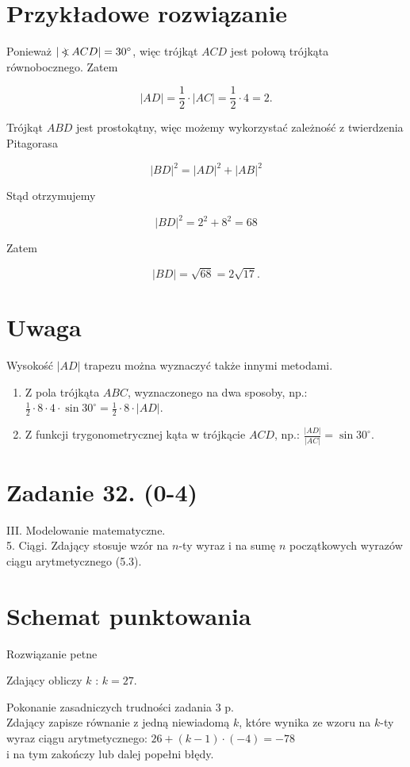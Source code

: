 \documentclass[10pt]{article}
\newcommand\Varangle{\mathop{{<\!\!\!\!\!\text{\small)}}\:}\nolimits}
\begin{document}
\section*{Przykładowe rozwiązanie}
Ponieważ $|\Varangle A C D|=30^{\circ}$, więc trójkąt $A C D$ jest połową trójkąta równobocznego. Zatem

$$
|A D|=\frac{1}{2} \cdot|A C|=\frac{1}{2} \cdot 4=2 .
$$

Trójkąt $A B D$ jest prostokątny, więc możemy wykorzystać zależność z twierdzenia Pitagorasa

$$
|B D|^{2}=|A D|^{2}+|A B|^{2}
$$

Stąd otrzymujemy

$$
|B D|^{2}=2^{2}+8^{2}=68
$$

Zatem

$$
|B D|=\sqrt{68}=2 \sqrt{17} .
$$

\section*{Uwaga}
Wysokość $|A D|$ trapezu można wyznaczyć także innymi metodami.

\begin{enumerate}
  \item Z pola trójkąta $A B C$, wyznaczonego na dwa sposoby, np.: $\frac{1}{2} \cdot 8 \cdot 4 \cdot \sin 30^{\circ}=\frac{1}{2} \cdot 8 \cdot|A D|$.
  \item Z funkcji trygonometrycznej kąta w trójkącie $A C D$, np.: $\frac{|A D|}{|A C|}=\sin 30^{\circ}$.
\end{enumerate}

\section*{Zadanie 32. (0-4)}
III. Modelowanie matematyczne.\\
5. Ciągi. Zdający stosuje wzór na $n$-ty wyraz i na sumę $n$ początkowych wyrazów ciągu arytmetycznego (5.3).

\section*{Schemat punktowania}
Rozwiązanie petne

Zdający obliczy $k$ : $k=27$.

Pokonanie zasadniczych trudności zadania 3 p.\\
Zdający zapisze równanie z jedną niewiadomą $k$, które wynika ze wzoru na $k$-ty wyraz ciągu arytmetycznego: $26+(k-1) \cdot(-4)=-78$\\
i na tym zakończy lub dalej popełni błędy.
\end{document}
